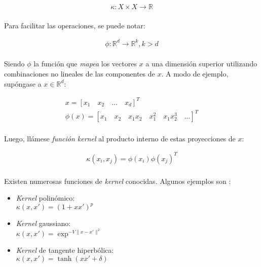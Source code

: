 \documentclass[12pt, twocolumn]{article}
\begin{document}
	\begin{align}
		\kappa : X \times X \to \mathbb{R}
	\end{align}
	
	\paragraph{} Para facilitar las operaciones, se puede notar:
	
	\begin{align}
		\phi : \mathbb{R}^{d} \to \mathbb{R}^{k} , k > d
	\end{align}
	
	\paragraph{} Siendo $\phi$ la función que \textit{mapea} los vectores $x$ a una dimensión superior utilizando combinaciones no lineales de las componentes de $x$. A modo de ejemplo, supóngase a $x \in \mathbb{R}^{d}$:
	
	\begin{align*}
		x = \left[x_{1}\quad x_{2}\quad\dots\quad x_{d}\right]^{T} \\ 
		\phi(x) = \left[x_{1}\quad x_{2}\quad x_{1}x_{2}\quad x_{1}^{2}\quad x_{1}x_{2}^{3} \quad \dots\right]^{T}
	\end{align*}
	
	\paragraph{} Luego, llámese \textit{función kernel} al producto interno de estas proyecciones de $x$:
	
	\begin{align}
		\kappa(x_{i}, x_{j}) = \phi(x_{i})\phi(x_{j})^{T}
	\end{align}
	
	\paragraph{} Existen numerosas funciones de \textit{kernel} conocidas. Algunos ejemplos son \cite{kernex}:
	
	\begin{itemize}
		\item \textit{Kernel} polinómico: \\ $\kappa(x,x')=(1+xx')^{p}$
		\item \textit{Kernel} gaussiano: \\ $\kappa(x,x')=\exp^{-V\lVert x-x'\rVert^{2}}$
		\item \textit{Kernel} de tangente hiperbólica: \\ $\kappa(x,x')=\tanh(xx'+\delta)$
	\end{itemize}
	
\end{document}
